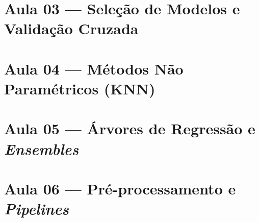 \documentclass[11pt,a4paper]{article}
\begin{document}
\section*{Aula 03 --- Seleção de Modelos e Validação Cruzada}

\begin{exercicio}
\label{ex:03-atalho}

\end{exercicio}

\begin{exercicio}
\label{ex:03-duasformas}

\end{exercicio}

\section*{Aula 04 --- Métodos Não Paramétricos (KNN)}

\begin{exercicio}
\label{ex:04-ponte}

\end{exercicio}

\section*{Aula 05 --- Árvores de Regressão e \emph{Ensembles}}

\begin{exercicio}
\label{ex:05-poda}

\end{exercicio}

\begin{exercicio}
\label{ex:05-condicoes}

\end{exercicio}

\section*{Aula 06 --- Pré-processamento e \emph{Pipelines}}

\begin{exercicio}
\label{ex:06-escala}

\end{exercicio}
\end{document}

